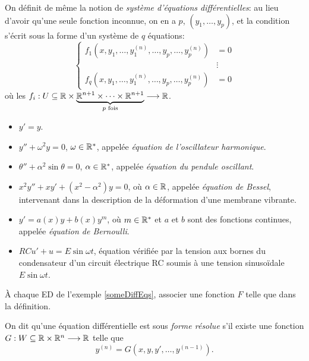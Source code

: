 \documentclass[../main.tex]{subfiles}
\begin{document}
\begin{rem}
	On définit de même la notion de \textit{système d'équations différentielles}: au lieu d'avoir qu'une seule fonction inconnue, on en a $p$, $(y_1,\ldots,y_p)$, et la condition s'écrit sous la forme d'un système de $q$ équations:
	\[
	\left\lbrace
	\begin{array}{ll}
	f_1(x,y_1,\ldots,y_1^{(n)},\ldots,y_p,\ldots,y_p^{(n)}) &= 0 \\
	&\vdots \\
	f_q(x,y_1,\ldots,y_1^{(n)},\ldots,y_p,\ldots,y_p^{(n)}) &= 0
	\end{array}
	\right.
	\]
	où les $f_i:U\subseteq \mathbb R\times \underbrace{\mathbb R^{n+1}\times\cdots\times\mathbb R^{n+1}}_{p\text{ fois}} \longrightarrow\mathbb R$.
\end{rem}

\begin{exe}\leavevmode\label{someDiffEqs}
\begin{itemize}
	\item $y' = y$.
	\item $y'' + \omega^2y = 0$, $\omega\in\mathbb R^*$, appelée \textit{équation de l'oscillateur harmonique}.
	\item $\theta'' + \alpha^2\sin\theta = 0$, $\alpha\in\mathbb R^*$, appelée \textit{équation du pendule oscillant}.
	\item $x^2y'' + xy' + (x^2-\alpha^2)y = 0$, où $\alpha\in\mathbb R$, appelée \textit{équation de Bessel}, intervenant dans la description de la déformation d'une membrane vibrante.
	\item $y' = a(x)y + b(x)y^m$, où $m\in\mathbb R^*$ et $a$ et $b$ sont des fonctions continues, appelée \textit{équation de Bernoulli}.
	\item $RCu' + u = E\sin\omega t$, équation vérifiée par la tension aux bornes du condensateur d'un circuit électrique RC soumis à une tension sinusoïdale $E\sin\omega t$.
\end{itemize}
\end{exe}

\begin{exo}
À chaque ED de l'exemple \ref{someDiffEqs}, associer une fonction $F$ telle que dans la définition.
\end{exo}

\begin{mydef}
	On dit qu'une équation différentielle est sous \textit{forme résolue} s'il existe une fonction $G:W\subseteq \mathbb R\times\mathbb R^n \longrightarrow \mathbb R$ telle que
    \begin{equation}\label{eq:resolvform}
    y^{(n)} = G(x,y,y',\ldots,y^{(n-1)}).
    \end{equation}
\end{mydef}
\end{document}
